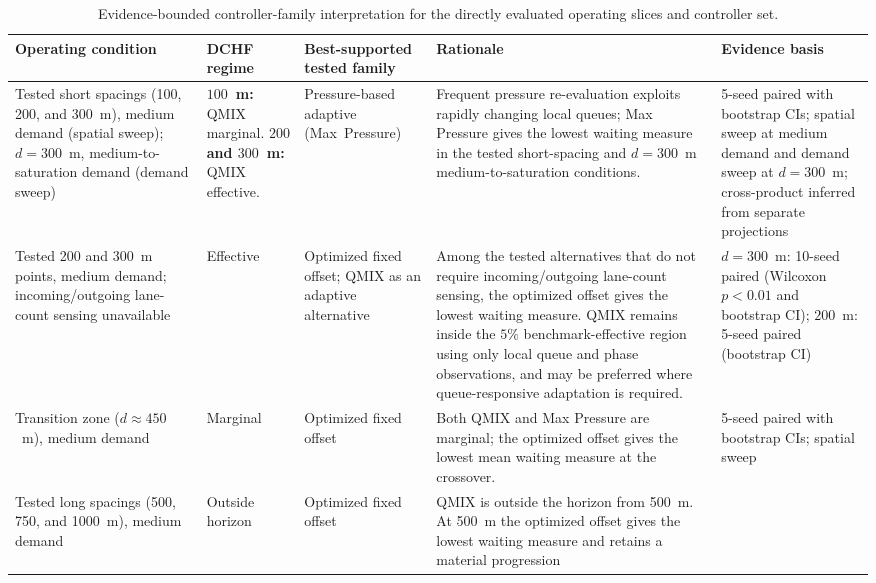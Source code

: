 \documentclass[review,12pt]{elsarticle}
\renewcommand{\arraystretch}{1.15}
\begin{document}
\begin{table}
\centering
\footnotesize
\setlength{\tabcolsep}{4pt}
\caption{Evidence-bounded controller-family interpretation for the directly
evaluated operating slices and controller set.}
\label{tab:controller_selection}
\begingroup
\renewcommand{\arraystretch}{0.82}
\begin{adjustbox}{max width=\linewidth,max totalheight=0.82\textwidth}
\begin{tabular}{p{3.0cm}p{2.6cm}p{3.8cm}p{5.0cm}p{3.6cm}}
\toprule
\textbf{Operating condition} &
\textbf{DCHF regime} &
\textbf{Best-supported tested family} &
\textbf{Rationale} &
\textbf{Evidence basis} \\
\midrule
Tested short spacings (100, 200, and 300~m), medium demand (spatial sweep);
$d=300$~m, medium-to-saturation demand (demand sweep) &
  \textbf{$100$~m:} QMIX marginal.\newline
  \textbf{$200$ and $300$~m:} QMIX effective. &
  Pressure-based adaptive (Max~Pressure) &
  Frequent pressure re-evaluation exploits rapidly changing local
  queues; Max Pressure gives the lowest waiting measure in the tested
  short-spacing and $d=300$~m medium-to-saturation conditions. &
  5-seed paired with bootstrap CIs; spatial sweep at medium demand
  and demand sweep at $d=300$~m; cross-product inferred from separate
  projections \\
Tested 200 and 300~m points, medium demand; incoming/outgoing
lane-count sensing unavailable &
  Effective &
  Optimized fixed offset; QMIX as an adaptive alternative &
  Among the tested alternatives that do not require incoming/outgoing
  lane-count sensing, the optimized offset gives the lowest waiting
  measure. QMIX remains inside the $5\%$ benchmark-effective region using
  only local queue and phase observations, and may be preferred where
  queue-responsive adaptation is required. &
  $d=300$~m: 10-seed paired (Wilcoxon $p<0.01$ and bootstrap CI);
  $200$~m: 5-seed paired (bootstrap CI) \\
Transition zone ($d\approx450$~m), medium demand &
  Marginal &
  Optimized fixed offset &
  Both QMIX and Max Pressure are marginal; the optimized offset gives
  the lowest mean waiting measure at the crossover. &
  5-seed paired with bootstrap CIs; spatial sweep \\
Tested long spacings (500, 750, and 1000~m), medium demand &
  Outside horizon &
  Optimized fixed offset &
  QMIX is outside the horizon from 500~m. At 500~m the optimized offset
  gives the lowest waiting measure and retains a material progression

\end{tabular}
\end{adjustbox}
\end{table}
\end{document}
